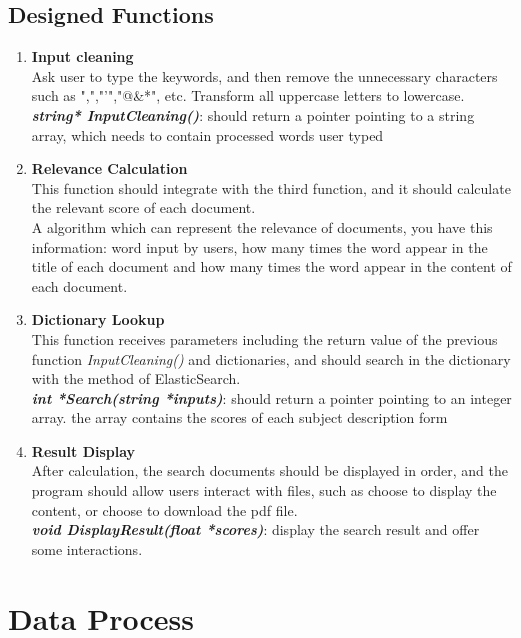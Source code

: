 \documentclass[manuscript,screen,review,12pt]{acmart}
\begin{document}
\subsection{Designed Functions}
\begin{enumerate}
    \item \textbf{Input cleaning} \\
        Ask user to type the keywords, and then remove the unnecessary characters such as ",","'","@\&*", etc. Transform all uppercase letters to lowercase. \\ 
         \textit{\textbf{string* InputCleaning()}}: should return a pointer pointing to a string array, which needs to contain processed words user typed

    \item \textbf{Relevance Calculation} \\
        This function should integrate with the third function, and it should calculate the relevant score of each document. \\
        A algorithm which can represent the relevance of documents, you have this information: word input by users, how many times the word appear in the title of each document and how many times the word appear in the content of each document.

    \item \textbf{Dictionary Lookup} \\
        This function receives parameters including the return value of the previous function \textit{InputCleaning()} and dictionaries, and should search in the dictionary with the method of ElasticSearch. \\
        \textit{\textbf{int *Search(string *inputs)}}: should return a pointer pointing to an integer array. the array contains the scores of each subject description form

    \item \textbf{Result Display} \\
        After calculation, the search documents should be displayed in order, and the program should allow users interact with files, such as choose to display the content, or choose to download the pdf file.\\
        \textbf{\textit{void DisplayResult(float *scores)}}: display the search result and offer some interactions.
\end{enumerate}

\section{Data Process}
\end{document}
